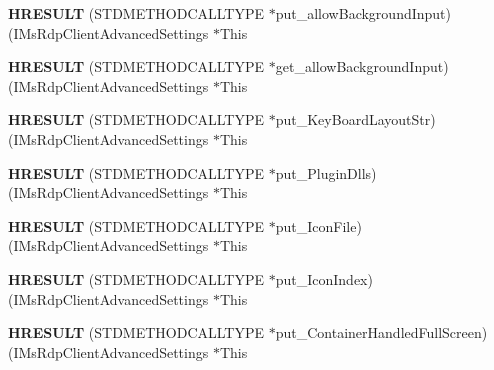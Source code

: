 \begin{DoxyCompactItemize}
{\bfseries H\+R\+E\+S\+U\+LT} (S\+T\+D\+M\+E\+T\+H\+O\+D\+C\+A\+L\+L\+T\+Y\+PE $\ast$put\+\_\+allow\+Background\+Input)(I\+Ms\+Rdp\+Client\+Advanced\+Settings $\ast$This
\item 
\mbox{\label{struct_i_ms_rdp_client_advanced_settings_vtbl_a241bcf169ccc3b0f29db89cdd1256a67}} 
{\bfseries H\+R\+E\+S\+U\+LT} (S\+T\+D\+M\+E\+T\+H\+O\+D\+C\+A\+L\+L\+T\+Y\+PE $\ast$get\+\_\+allow\+Background\+Input)(I\+Ms\+Rdp\+Client\+Advanced\+Settings $\ast$This
\item 
\mbox{\label{struct_i_ms_rdp_client_advanced_settings_vtbl_ab4fa853b5d4a0c782a3d9764e8f26ed2}} 
{\bfseries H\+R\+E\+S\+U\+LT} (S\+T\+D\+M\+E\+T\+H\+O\+D\+C\+A\+L\+L\+T\+Y\+PE $\ast$put\+\_\+\+Key\+Board\+Layout\+Str)(I\+Ms\+Rdp\+Client\+Advanced\+Settings $\ast$This
\item 
\mbox{\label{struct_i_ms_rdp_client_advanced_settings_vtbl_a386533bf037099b2b8526768195f66fe}} 
{\bfseries H\+R\+E\+S\+U\+LT} (S\+T\+D\+M\+E\+T\+H\+O\+D\+C\+A\+L\+L\+T\+Y\+PE $\ast$put\+\_\+\+Plugin\+Dlls)(I\+Ms\+Rdp\+Client\+Advanced\+Settings $\ast$This
\item 
\mbox{\label{struct_i_ms_rdp_client_advanced_settings_vtbl_a25d978b9e454a028b6e317fe94bfa5fd}} 
{\bfseries H\+R\+E\+S\+U\+LT} (S\+T\+D\+M\+E\+T\+H\+O\+D\+C\+A\+L\+L\+T\+Y\+PE $\ast$put\+\_\+\+Icon\+File)(I\+Ms\+Rdp\+Client\+Advanced\+Settings $\ast$This
\item 
\mbox{\label{struct_i_ms_rdp_client_advanced_settings_vtbl_a908fb0d422151b3684ba9a040001f239}} 
{\bfseries H\+R\+E\+S\+U\+LT} (S\+T\+D\+M\+E\+T\+H\+O\+D\+C\+A\+L\+L\+T\+Y\+PE $\ast$put\+\_\+\+Icon\+Index)(I\+Ms\+Rdp\+Client\+Advanced\+Settings $\ast$This
\item 
\mbox{\label{struct_i_ms_rdp_client_advanced_settings_vtbl_a7d6ca4b8a392d578ae1efdcc0c21e520}} 
{\bfseries H\+R\+E\+S\+U\+LT} (S\+T\+D\+M\+E\+T\+H\+O\+D\+C\+A\+L\+L\+T\+Y\+PE $\ast$put\+\_\+\+Container\+Handled\+Full\+Screen)(I\+Ms\+Rdp\+Client\+Advanced\+Settings $\ast$This
\item 

\end{DoxyCompactItemize}
